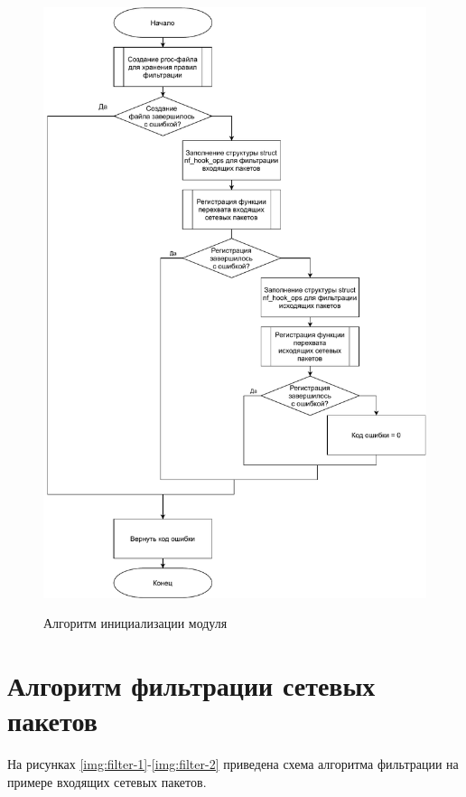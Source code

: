 \begin{figure}[h!]
	\begin{center}
		{\includegraphics[scale = 0.65]{inc/img/register.pdf}}
		\caption{Алгоритм инициализации модуля}
		\label{img:register}
	\end{center}
\end{figure}


\section{Алгоритм фильтрации сетевых пакетов}

На рисунках \ref{img:filter-1}-\ref{img:filter-2} приведена схема алгоритма фильтрации на примере входящих сетевых пакетов.


